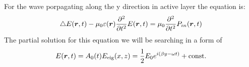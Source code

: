 For the wave porpagating along the y direction in active layer the equation is:
\begin{equation}
	\triangle E(\mbox{\boldmath $r$},t) - \mu_0 \varepsilon(\mbox{\boldmath $r$}) \frac{\partial^2}{\partial t^2} E(\mbox{\boldmath $r$}, t) = \mu_0 \frac{\partial^2}{\partial t^2} P_{in}(\mbox{\boldmath $r$},t)
	\label{1.46}
\end{equation}
The partial solution for this equation we will be searching in a form of
\begin{equation*}
	E(\mbox{\boldmath $r$}, t) = A_0(t) E_{\text{eig}}(x,z) = \frac{1}{2} E_0 e^{i (\beta y - \omega t)} + \text{const}.
\end{equation*}